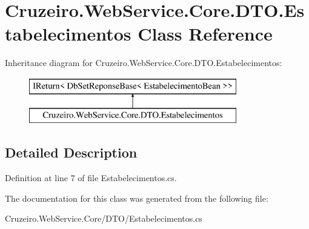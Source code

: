 \hypertarget{class_cruzeiro_1_1_web_service_1_1_core_1_1_d_t_o_1_1_estabelecimentos}{}\section{Cruzeiro.\+Web\+Service.\+Core.\+D\+T\+O.\+Estabelecimentos Class Reference}
\label{class_cruzeiro_1_1_web_service_1_1_core_1_1_d_t_o_1_1_estabelecimentos}
Inheritance diagram for Cruzeiro.\+Web\+Service.\+Core.\+D\+T\+O.\+Estabelecimentos\+:\begin{figure}[H]
\begin{center}
\leavevmode
\includegraphics[height=2.000000cm]{class_cruzeiro_1_1_web_service_1_1_core_1_1_d_t_o_1_1_estabelecimentos}
\end{center}
\end{figure}


\subsection{Detailed Description}


Definition at line 7 of file Estabelecimentos.\+cs.



The documentation for this class was generated from the following file\+:\begin{DoxyCompactItemize}
\item 
Cruzeiro.\+Web\+Service.\+Core/\+D\+T\+O/Estabelecimentos.\+cs\end{DoxyCompactItemize}

